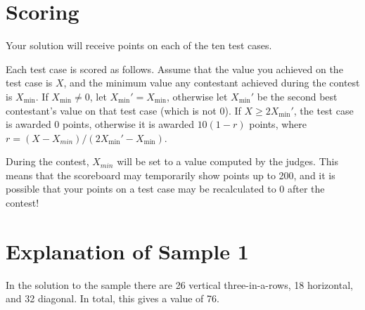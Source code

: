 \section*{Scoring}
Your solution will receive points on each of the ten test cases.

Each test case is scored as follows.
Assume that the value you achieved on the test case is $X$, and
the minimum value any contestant achieved during the contest is $X_{\min}$.
If $X_{\min} \ne 0$, let $X_{\min}' = X_{\min}$, otherwise let $X_{\min}'$ be the second best contestant's value on that test case (which is not 0).
If $X \ge 2X_{\min}'$, the test case is awarded $0$ points, otherwise it is awarded $10(1 - r)$ points, where $r = (X - X_{min}) / (2X_{\min}' - X_{\min})$.

During the contest, $X_{min}$ will be set to a value computed by the judges.
This means that the scoreboard may temporarily show points up to 200, and it is possible that your points on a test case may be recalculated to 0 after the contest!

\section*{Explanation of Sample 1}
In the solution to the sample there are 26 vertical three-in-a-rows, 18 horizontal, and 32 diagonal.
In total, this gives a value of 76.
